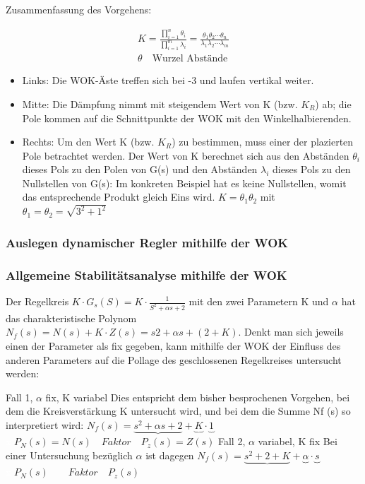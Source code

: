\begin{multicols}{2}
Zusammenfassung des Vorgehens:

\begin{eqnarray}
	K=\frac{\prod_{i=1}^{n} \theta_i}{\prod_{i=1}^{m}\lambda_i}=\frac{\theta_1\theta_2\cdots\theta_n}{\lambda_1\lambda_2\cdots\lambda_m} \\
	\theta \quad \text{Wurzel Abstände}
\end{eqnarray}

\begin{itemize}
	\item  Links: Die WOK-Äste treffen sich bei -3 und laufen vertikal weiter.
	\item  Mitte: Die Dämpfung nimmt mit steigendem Wert von K (bzw. $K_R$) ab; die
	Pole kommen auf die Schnittpunkte der WOK mit den Winkelhalbierenden.
	\item  Rechts: Um den Wert K (bzw. $K_R$) zu bestimmen, muss einer der plazierten
	Pole betrachtet werden. Der Wert von K berechnet sich aus den Abständen $\theta_i$ dieses Pols zu den Polen von G(s) und den Abständen $\lambda_i$ dieses Pols zu den
	Nullstellen von G(s): Im konkreten Beispiel hat es keine Nullstellen, womit das entsprechende Produkt
	gleich Eins wird. 	$K=\theta_1\theta_2$ mit $\theta_1=\theta_2=\sqrt{3^2+1^2}$
\end{itemize}

\end{multicols}


\subsubsection{Auslegen dynamischer Regler mithilfe der WOK}


\subsubsection{Allgemeine Stabilitätsanalyse mithilfe der WOK}
Der Regelkreis $K\cdot G_s(S)=K\cdot\frac{1}{S^2+\alpha s + 2}$ mit den zwei Parametern K und $\alpha$ hat das charakteristische
Polynom $N_f(s)=N(s) + K\cdot Z(s) = s2 + \alpha s + (2 + K)$. Denkt man sich jeweils einen der
Parameter als fix gegeben, kann mithilfe der WOK der Einfluss des anderen Parameters
auf die Pollage des geschlossenen Regelkreises untersucht werden:

Fall 1, $\alpha$ fix, K variabel
Dies entspricht dem bisher besprochenen Vorgehen, bei dem die Kreisverstärkung
K untersucht wird, und bei dem die Summe Nf (s) so interpretiert wird:
$N_f(s)=\underbrace{s^2+\alpha s + 2} +\underbrace{K}\cdot\underbrace{1} $\\
\textcolor{white}{x} \hspace{12.25cm} $P_N(s)=N(s) \quad Faktor  \quad P_z(s)=Z(s)$
Fall 2, $\alpha$ variabel, K fix Bei einer Untersuchung bezüglich $\alpha$ ist dagegen
$N_f(s)=\underbrace{s^2+ 2 + K} +\underbrace{\alpha}\cdot\underbrace{s} $\\
\textcolor{white}{x} \hspace{13.5cm} $P_N(s) \qquad Faktor  \quad P_z(s)$
